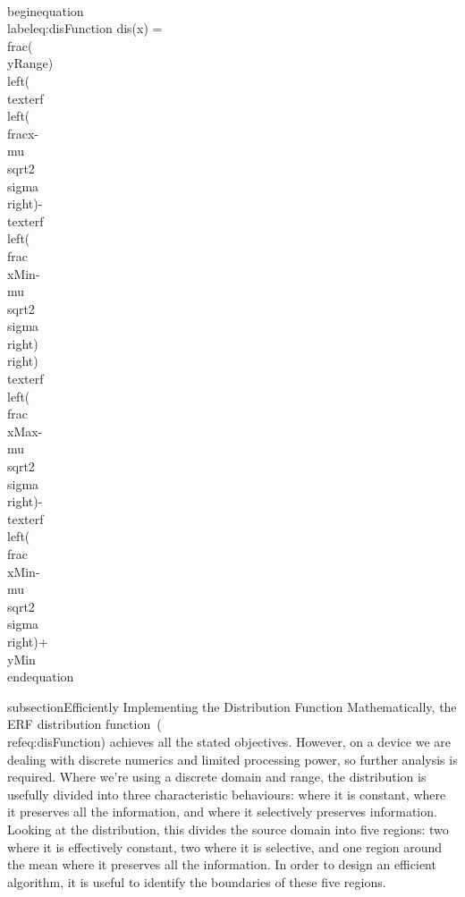 \\begin{equation}\\label{eq:disFunction}
  dis(x) = \\frac{(\\yRange) \\left(\\text{erf}\\left(\\frac{x-\\mu }{\\sqrt{2} \\sigma }\\right)-\\text{erf}\\left(\\frac{\\xMin-\\mu }{\\sqrt{2} \\sigma }\\right)\\right)}{\\text{erf}\\left(\\frac{\\xMax-\\mu }{\\sqrt{2} \\sigma }\\right)-\\text{erf}\\left(\\frac{\\xMin-\\mu }{\\sqrt{2} \\sigma }\\right)}+\\yMin
\\end{equation}


subsection{Efficiently Implementing the Distribution Function}
Mathematically, the ERF distribution function~(\\ref{eq:disFunction}) achieves all the stated objectives. However, on a device we are dealing with discrete numerics and limited processing power, so further analysis is required. Where we're using a discrete domain and range, the distribution is usefully divided into three characteristic behaviours:  where it is constant, where it preserves all the information, and where it selectively preserves information. Looking at the distribution, this divides the source domain into five regions: two where it is effectively constant, two where it is selective, and one region around the mean where it preserves all the information. In order to design an efficient algorithm, it is useful to identify the boundaries of these five regions.


